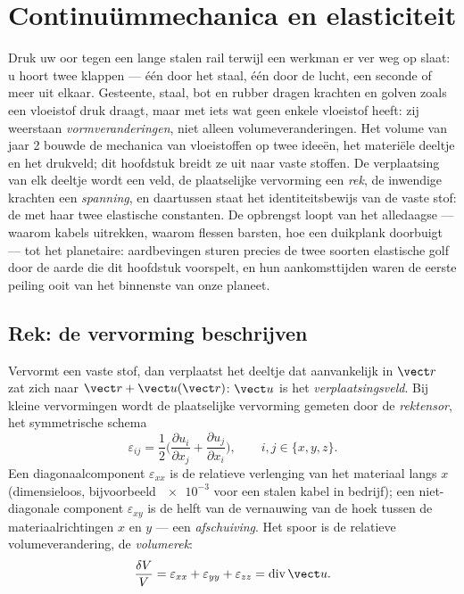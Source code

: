 \chapter{Continuümmechanica en elasticiteit}\label{ch:b3:continuum-elasticity}

Druk uw oor tegen een lange stalen rail terwijl een werkman er ver weg op
slaat: u hoort twee klappen --- één door het staal, één door de lucht,
een seconde of meer uit elkaar. Gesteente, staal, bot en rubber dragen
krachten en golven zoals een vloeistof druk draagt, maar met iets wat
geen enkele vloeistof heeft: zij weerstaan \emph{vormveranderingen}, niet
alleen volumeveranderingen. Het volume van jaar 2 bouwde de mechanica van
vloeistoffen op twee ideeën, het materiële deeltje en het drukveld; dit
hoofdstuk breidt ze uit naar vaste stoffen. De verplaatsing van elk
deeltje wordt een veld, de plaatselijke vervorming een \emph{rek}, de
inwendige krachten een \emph{spanning}, en daartussen staat het
identiteitsbewijs van de vaste stof: de  met haar twee
elastische constanten. De opbrengst loopt van het alledaagse --- waarom
kabels uitrekken, waarom flessen barsten, hoe een duikplank doorbuigt ---
tot het planetaire: aardbevingen sturen precies de twee soorten
elastische golf door de aarde die dit hoofdstuk voorspelt, en hun
aankomsttijden waren de eerste peiling ooit van het binnenste van onze
planeet.

\section{Rek: de vervorming beschrijven}

\begin{definition}\label{def:b3:continuum-elasticity:strain}
Vervormt een vaste stof, dan verplaatst het deeltje dat aanvankelijk in
$\vect r$ zat zich naar $\vect r + \vect u(\vect r)$: $\vect u$ is het
\emph{verplaatsingsveld}. Bij kleine vervormingen wordt de plaatselijke
vervorming gemeten door de \emph{rektensor}, het symmetrische schema
\[
\varepsilon_{ij} = \frac12\Big(
 \frac{\partial u_i}{\partial x_j} + \frac{\partial u_j}{\partial x_i}
\Big) , \qquad i, j \in \{x, y, z\} .
\]
Een diagonaalcomponent $\varepsilon_{xx}$ is de relatieve verlenging van
het materiaal langs $x$ (dimensieloos, bijvoorbeeld $\num{e-3}$ voor een
stalen kabel in bedrijf); een niet-diagonale component $\varepsilon_{xy}$
is de helft van de vernauwing van de hoek tussen de materiaalrichtingen
$x$ en $y$ --- een \emph{afschuiving}. Het spoor is de relatieve
volumeverandering, de \emph{volumerek}:
\[
\frac{\delta V}{V} = \varepsilon_{xx} + \varepsilon_{yy} +
\varepsilon_{zz} = \operatorname{div}\vect u .
\]
\end{definition}

